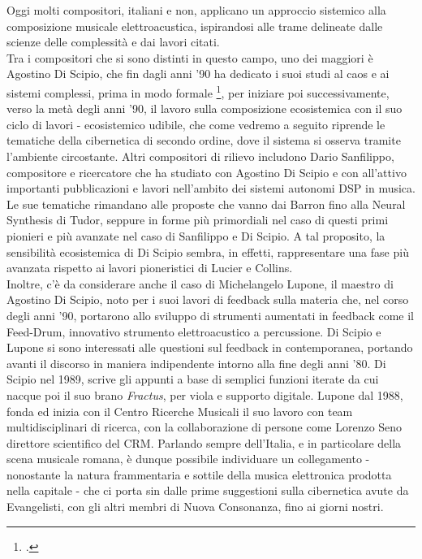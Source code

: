 Oggi molti compositori, italiani e non, 
applicano un approccio sistemico alla composizione musicale elettroacustica, 
ispirandosi alle trame delineate dalle scienze delle complessità e dai lavori citati. \\
Tra i compositori che si sono distinti in questo campo, 
uno dei maggiori è Agostino Di Scipio, 
che fin dagli anni '90 ha dedicato i suoi studi al caos e ai sistemi complessi, 
prima in modo formale \footcite{discipioiterated}, per iniziare poi successivamente, 
verso la metà degli anni '90, il lavoro sulla composizione ecosistemica con il suo ciclo di lavori 
- ecosistemico udibile, che come vedremo a seguito riprende le tematiche della cibernetica di secondo ordine, 
dove il sistema si osserva tramite l'ambiente circostante.
Altri compositori di rilievo includono Dario Sanfilippo, 
compositore e ricercatore che ha studiato con Agostino Di Scipio e con all'attivo 
importanti pubblicazioni e lavori nell'ambito dei sistemi autonomi DSP in musica. 
Le sue tematiche rimandano alle proposte che vanno dai Barron fino alla Neural Synthesis di Tudor, 
seppure in forme più primordiali nel caso di questi primi pionieri e 
più avanzate nel caso di Sanfilippo e Di Scipio.
A tal proposito, la sensibilità ecosistemica di Di Scipio sembra, in effetti, 
rappresentare una fase più avanzata rispetto ai lavori pioneristici di Lucier e Collins. \\
Inoltre, c'è da considerare anche il caso di Michelangelo Lupone, 
il maestro di Agostino Di Scipio, noto per i suoi lavori di feedback sulla materia che, 
nel corso degli anni '90, portarono allo sviluppo di strumenti aumentati in feedback come il Feed-Drum, 
innovativo strumento elettroacustico a percussione.
Di Scipio e Lupone si sono interessati alle questioni sul feedback in contemporanea, 
portando avanti il discorso in maniera indipendente intorno alla fine degli anni '80. 
Di Scipio nel 1989, scrive gli appunti a base di semplici funzioni
iterate da cui nacque poi il suo brano 
\textit{Fractus}, per viola e supporto digitale.
Lupone dal 1988, fonda ed inizia con il Centro Ricerche Musicali il suo lavoro
con team multidisciplinari di ricerca,
con la collaborazione di persone come Lorenzo Seno direttore scientifico del CRM.
Parlando sempre dell'Italia, e in particolare della scena musicale romana, 
è dunque possibile individuare un collegamento -
nonostante la natura frammentaria e sottile della musica elettronica prodotta nella capitale -
che ci porta sin dalle prime suggestioni sulla cibernetica avute da Evangelisti, 
con gli altri membri di Nuova Consonanza, fino ai giorni nostri. 
